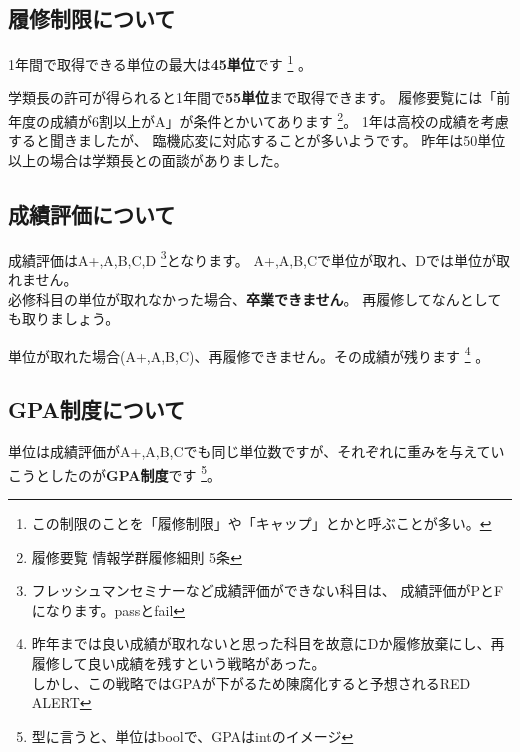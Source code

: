 \documentclass[a4j]{jsarticle}
\newcommand{\RA}{{\color{red}\large RED ALERT}}
\newcommand{\bold}[1]{{\bfseries #1}}
\begin{document}
\subsection{履修制限について}
1年間で取得できる単位の最大は{\bf\Large 45単位}です
\footnote{この制限のことを「履修制限」や「キャップ」とかと呼ぶことが多い。}
。

学類長の許可が得られると1年間で\bold{55単位}まで取得できます。
履修要覧には「前年度の成績が6割以上がA」が条件とかいてあります
\footnote{履修要覧 情報学群履修細則 5条}。
1年は高校の成績を考慮すると聞きましたが、
臨機応変に対応することが多いようです。
昨年は50単位以上の場合は学類長との面談がありました。


\subsection{成績評価について}
成績評価はA+,A,B,C,D
\footnote{フレッシュマンセミナーなど成績評価ができない科目は、
成績評価がPとFになります。passとfail}となります。
A+,A,B,Cで単位が取れ、Dでは単位が取れません。
\\必修科目の単位が取れなかった場合、\bold{卒業できません}。
再履修してなんとしても取りましょう。

単位が取れた場合(A+,A,B,C)、再履修できません。その成績が残ります
\footnote{昨年までは良い成績が取れないと思った科目を故意にDか履修放棄にし、再履修して良い成績を残すという戦略があった。
\\しかし、この戦略ではGPAが下がるため陳腐化すると予想される\RA}
。


\subsection{GPA制度について}
\begin{table}
\vspace{-10mm}
\begin{center}
\end{center}
\end{table}
単位は成績評価がA+,A,B,Cでも同じ単位数ですが、それぞれに重みを与えていこうとしたのが\bold{GPA制度}です
\footnote{型に言うと、単位はboolで、GPAはintのイメージ}。
\end{document}
